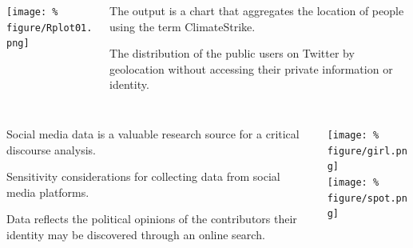 \documentclass[unknownkeysallowed,usepdftitle=false, parskip=full]{beamer}
\newcommand{\secvariable}{nothing}
\newcommand{\mysection}[1]{\renewcommand{\secvariable}{#1}
}
\begin{document}
\begin{frame}\label{\secvariable}
  \begin{columns}[t]
  \begin{column}[c]{0.40\textwidth}

\texttt{[image: \%
figure/Rplot01.png]}
    \end{column}
    \begin{column}[c]{0.45\textwidth}
    \parbox{\linewidth}{

      The output  is a chart that aggregates the location of people using the term ClimateStrike.
      
      
 \vspace{12pt}

The distribution of the public users on Twitter by geolocation without accessing their private information or identity. 

      }
    \end{column}
    
  \end{columns}

  
\end{frame}

\mysection{radar}
\begin{frame}\label{\secvariable}
  \begin{columns}[t]
    \begin{column}[c]{0.45\textwidth}
    \parbox{\linewidth}{

    Social media data is a valuable research source for a critical discourse analysis.
       \vspace{12pt}
       
Sensitivity considerations for collecting data from social media platforms. 
 \vspace{12pt}
 
Data reflects the political opinions of the contributors their identity may be discovered through an online search.
 \vspace{12pt}

      }
    \end{column}
    \begin{column}[c]{0.45\textwidth}
\texttt{[image: \%
figure/girl.png]}\\
\vspace{12pt}
\texttt{[image: \%
figure/spot.png]}
    \end{column}
  \end{columns}

  
\end{frame}
\end{document}
